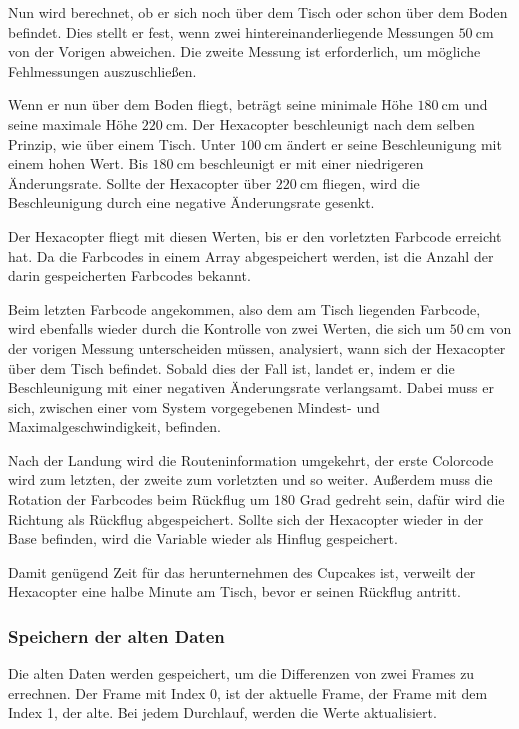     Nun wird berechnet, ob er sich noch über dem Tisch oder schon über dem Boden befindet. Dies stellt er fest, wenn zwei hintereinanderliegende Messungen $\SI{50}{\centi\metre}$ von der Vorigen abweichen. Die zweite Messung ist erforderlich, um mögliche Fehlmessungen auszuschließen.

    Wenn er nun über dem Boden fliegt, beträgt seine minimale Höhe $\SI{180}{\centi\metre}$ und seine maximale Höhe $\SI{220}{\centi\metre}$.
    Der Hexacopter beschleunigt nach dem selben Prinzip, wie über einem Tisch. Unter $\SI{100}{\centi\metre}$ ändert er seine Beschleunigung mit einem hohen Wert. Bis $\SI{180}{\centi\metre}$ beschleunigt er mit einer niedrigeren Änderungsrate. Sollte der Hexacopter über $\SI{220}{\centi\metre}$ fliegen, wird die Beschleunigung durch eine negative Änderungsrate gesenkt.

    Der Hexacopter fliegt mit diesen Werten, bis er den vorletzten Farbcode erreicht hat. Da die Farbcodes in einem Array abgespeichert werden, ist die Anzahl der darin gespeicherten Farbcodes bekannt.

    Beim letzten Farbcode angekommen, also dem am Tisch liegenden Farbcode, wird ebenfalls wieder durch die Kontrolle von zwei Werten, die sich um $\SI{50}{\centi\metre}$ von der vorigen Messung unterscheiden müssen, analysiert, wann sich der Hexacopter über dem Tisch befindet. Sobald dies der Fall ist, landet er, indem er die Beschleunigung mit einer negativen Änderungsrate verlangsamt. Dabei muss er sich, zwischen einer vom System vorgegebenen Mindest- und Maximalgeschwindigkeit, befinden.

    Nach der Landung wird die Routeninformation umgekehrt, der erste Colorcode wird zum letzten, der zweite zum vorletzten und so weiter. Außerdem muss die Rotation der Farbcodes beim Rückflug um 180 Grad gedreht sein, dafür wird die Richtung als Rückflug abgespeichert. Sollte sich der Hexacopter wieder in der Base befinden, wird die Variable wieder als Hinflug gespeichert.

    Damit genügend Zeit für das herunternehmen des Cupcakes ist, verweilt der Hexacopter eine halbe Minute am Tisch, bevor er seinen Rückflug antritt.

    \subsubsection{Speichern der alten Daten}
    Die alten Daten werden gespeichert, um die Differenzen von zwei Frames zu errechnen. Der Frame mit Index 0, ist der aktuelle Frame, der Frame mit dem Index 1, der alte. Bei jedem Durchlauf, werden die Werte aktualisiert.

